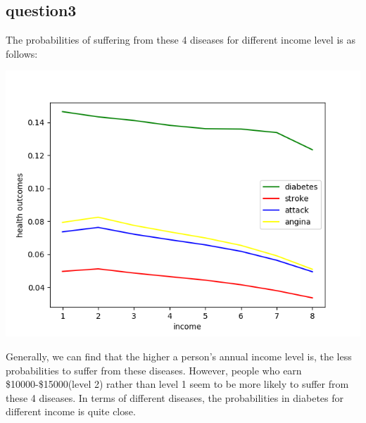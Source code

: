 \documentclass[aps,letterpaper,10pt]{revtex4}
\begin{document}
\subsection{question3}
The probabilities of suffering from these 4 diseases for different 
income level is as follows:
\begin{center}
    \includegraphics[scale=0.5]{3_figure.png}
\end{center}
\par
Generally, we can find that the higher a person's annual income level is, the less probabilities 
to suffer from these diseases. However, people who earn \$10000-\$15000(level 2) rather than level 1 seem to be more likely to 
suffer from these 4 diseases. In terms of different diseases, the probabilities in diabetes for different income is quite close. 
\newpage
\end{document}
